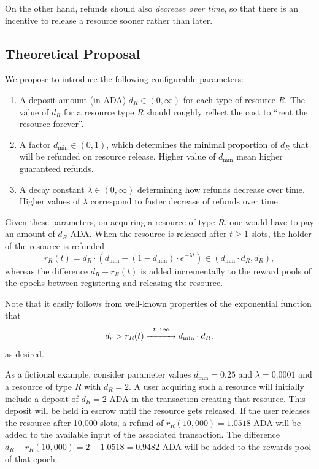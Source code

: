 \documentclass[11pt,a4paper]{article}
\begin{document}
On the other hand, refunds should also \emph{decrease over time}, so that
there is an incentive to release a resource sooner rather than later.

\subsection{Theoretical Proposal}

We propose to introduce the following configurable parameters:
\begin{enumerate}
    \item
        A deposit amount (in ADA) $d_R\in(0,\infty)$ for each type of resource
        $R$. The value of $d_R$ for a resource type $R$ should roughly reflect
        the cost to ``rent the resource forever''.
    \item
        A factor $d_{\min}\in(0,1)$, which determines the minimal proportion of
        $d_R$ that will be refunded on resource release. Higher value of
        $d_{\min}$ mean higher guaranteed refunds.
    \item
        A decay constant $\lambda\in(0,\infty)$ determining how refunds decrease
        over time. Higher values of $\lambda$ correspond to faster decrease of
        refunds over time.
\end{enumerate}

Given these parameters, on acquiring a resource of type $R$, one would have to
pay an amount of $d_R$ ADA\@. When the resource is released after $t\geq 1$ slots,
the holder of the resource is refunded
\[
    r_R(t)=d_R\cdot\left(d_{\min}+(1-d_{\min})\cdot e^{-\lambda t}\right)\in(d_{\min}\cdot d_R,d_R),
\]
whereas the difference $d_R-r_R(t)$ is added incrementally to the reward pools of
the epochs between registering and releasing the resource.

Note that it easily follows from well-known properties of the exponential
function that
\[
    d_r>r_R(t)\stackrel{t\rightarrow\infty}{\xrightarrow{\hspace{10mm}}}d_{\min}\cdot d_R,
\]
as desired.

As a fictional example, consider parameter values $d_{\min}=0.25$ and $\lambda=0.0001$
and a resource of type $R$ with $d_R=2$. A user acquiring such a resource
will initially include a deposit of $d_R=2$ ADA in the transaction creating that
resource. This deposit will be held in escrow until the resource gets released.
If the user releases the resource after 10,000 slots, a refund of
$r_R(10,000)=1.0518$ ADA will be added to the available input of the associated
transaction. The difference $d_R-r_R(10,000)=2-1.0518=0.9482$ ADA will be added
to the rewards pool of that epoch.
\end{document}
